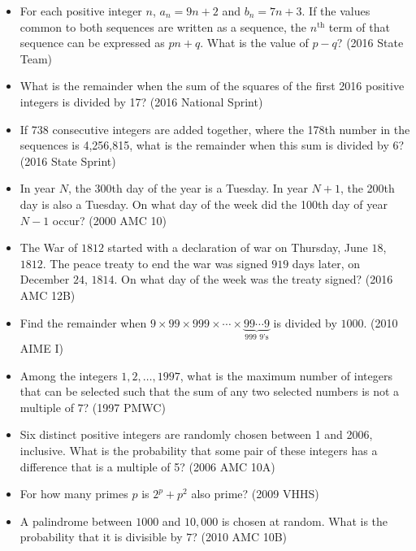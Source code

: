 \documentclass{article}
\begin{document}
\begin{itemize}

\item For each positive integer $n$, $a_n=9n+2$ and $b_n=7n+3$. If the values common to both sequences are written as a sequence, the $n^\text{th}$ term of that sequence can be expressed as $pn+q$. What is the value of $p-q$? (2016 State Team)

\item What is the remainder when the sum of the squares of the first 2016 positive integers is divided by 17? (2016 National Sprint)

\item If 738 consecutive integers are added together, where the 178th number in the sequences is 4,256,815, what is the remainder when this sum is divided by 6? (2016 State Sprint)

\item In year $N$, the 300th day of the year is a Tuesday. In year $N+1$, the 200th day is also a Tuesday. On what day of the week did the 100th day of year $N-1$ occur? (2000 AMC 10)

\item The War of $1812$ started with a declaration of war on Thursday, June $18$, $1812$. The peace treaty to end the war was signed $919$ days later, on December $24$, $1814$. On what day of the week was the treaty signed? (2016 AMC 12B)

\item Find the remainder when $9 \times 99 \times 999 \times \cdots \times \underbrace{99\cdots9}_{\text{999 9's}}$ is divided by $1000$. (2010 AIME I)


\item Among the integers $1, 2,\dots , 1997$,  what is the maximum number of integers that can be selected such that the sum of any two selected numbers is not a multiple of $7$? (1997 PMWC)

\item Six distinct positive integers are randomly chosen between 1 and 2006, inclusive. What is the probability that some pair of these integers has a difference that is a multiple of 5? (2006 AMC 10A)

\item For how many primes $p$ is $2^p+p^2$ also prime? (2009 VHHS)

\item A palindrome between $1000$ and $10,000$ is chosen at random. What is the probability that it is divisible by $7$? (2010 AMC 10B)


\end{itemize}
\end{document}
